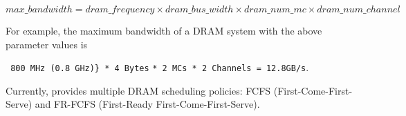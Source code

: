 \begin{equation}
\label{eq:bandwidth}
max\_bandwidth = dram\_frequency \times dram\_bus\_width \times dram\_num\_mc \times dram\_num\_channel 
\end{equation}

\noindent
For example, the maximum bandwidth of a DRAM system with the above parameter
values is

\Verb+ 800 MHz (0.8 GHz)} * 4 Bytes+
  \Verb+* 2 MCs * 2 Channels = 12.8GB/s+.
 

\noindent
Currently, \SIM provides multiple DRAM scheduling policies: FCFS
(First-Come-First-Serve) and FR-FCFS (First-Ready First-Come-First-Serve).
















